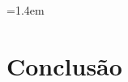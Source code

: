 \documentclass[11pt,a4paper]{article}
\theoremstyle{plain}
\theoremstyle{definition}
\theoremstyle{remark}
\begin{document}
\baselineskip=1.4em


\pagebreak

\tableofcontents
\pagebreak

\listoffigures
\pagebreak

\listoftables
\pagebreak


\pagebreak



\pagebreak



\pagebreak



\pagebreak

\section{Conclusão}
\pagebreak


\pagebreak


%







\end{document}
